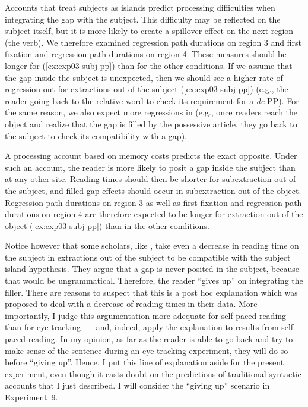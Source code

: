 Accounts that treat subjects as islands predict processing difficulties when integrating the gap with the subject. This difficulty may be reflected on the subject itself, but it is more likely to create a spillover effect on the next region (the verb). We therefore examined regression path durations on region 3 and first fixation and regression path durations on region 4. These measures should be longer for (\ref{ex:exp03-subj-pp}) than for the other conditions. If we assume that the gap inside the subject is unexpected, then we should see a higher rate of regression out  for extractions out of the subject (\ref{ex:exp03-subj-pp}) (e.g., the reader going back to the relative word to check its requirement for a \emph{de}-PP). For the same reason, we also expect more regressions in (e.g., once readers reach the object and realize that the gap is filled by the possessive article, they go back to the subject to check its compatibility with a gap). 

A processing account based on memory costs predicts the exact opposite. Under such an account, the reader is more likely to posit a gap inside the subject than at any other site. Reading times should then be shorter for subextraction out of the subject, and filled-gap effects should occur in subextraction out of the object. Regression path durations on region 3 as well as first fixation and regression path durations on region 4 are therefore expected to be longer for extraction out of the object (\ref{ex:exp03-subj-pp}) than in the other conditions.

Notice however that some scholars, like \citet{Yoshida.2014}, take even a decrease in reading time on the subject in extractions out of the subject to be compatible with the subject island hypothesis. They argue that a gap is never posited in the subject, because that would be ungrammatical. Therefore, the reader ``gives up'' on integrating the filler. There are reasons to suspect that this is a post hoc explanation which was proposed to deal with a decrease of reading times in their data. More importantly, I judge this argumentation more adequate for self-paced reading than for eye tracking~--- and, indeed, \citet{Yoshida.2014} apply the explanation to results from self-paced reading. In my opinion, as far as the reader is able to go back and try to make sense of the sentence during an eye tracking experiment, they will do so before ``giving up''. Hence, I put this line of explanation aside for the present experiment, even though it casts doubt on the predictions of traditional syntactic accounts that I just described. I will consider the ``giving up'' scenario in Experiment~9. 

